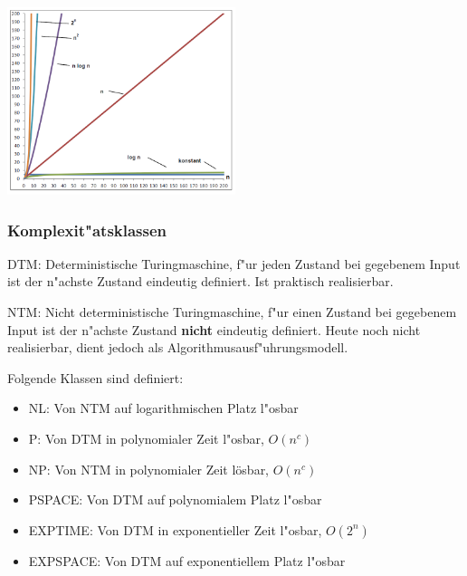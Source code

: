\begin{center}
{\includegraphics[width=0.5\textwidth]{images/Algorithmen/Wachstumsfunktionen.png}}
\label{Fig: Verschiedene Wachstumsfunktionen}
\end{center}



\subsubsection{Komplexit"atsklassen}
DTM: Deterministische Turingmaschine, f"ur jeden Zustand bei gegebenem Input ist der n"achste Zustand eindeutig definiert. Ist praktisch realisierbar.

NTM: Nicht deterministische Turingmaschine, f"ur einen Zustand bei gegebenem Input ist der n"achste Zustand \textbf{nicht} eindeutig definiert. Heute noch nicht realisierbar, dient jedoch als Algorithmusausf"uhrungsmodell.

Folgende Klassen sind definiert:
\begin{itemize}
\item NL:       Von NTM auf logarithmischen Platz l"osbar 
\item P:        Von DTM in polynomialer Zeit l"osbar, $O(n^c)$
\item NP:       Von NTM in polynomialer Zeit lösbar, $O(n^c)$
\item PSPACE:   Von DTM auf polynomialem Platz l"osbar
\item EXPTIME:  Von DTM in exponentieller Zeit l"osbar, $O(2^n)$
\item EXPSPACE: Von DTM auf exponentiellem Platz l"osbar
\end{itemize}

